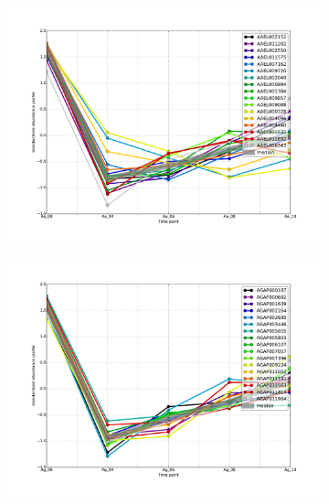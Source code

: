 
\begin{figure}[hp]
% 
\begin{subfigure}[t]{.6\linewidth}
\includegraphics[width=\linewidth]{figures/figs/ecr_and_insects_ptci_20130903/downAt4_gene_profiles_from_cummerbund/Aa_downAt4_cls19_Ag_target_FPKMs_vb_orthos.pdf}
\caption{}
\label{fig:cluster19-Aa}
\end{subfigure}%
%
\begin{subfigure}[t]{.6\linewidth}
\includegraphics[width=\linewidth]{figures/figs/ecr_and_insects_ptci_20130903/downAt4_gene_profiles_from_cummerbund/Ag_downAt4_cls19_Ag_target_FPKMs_vb_orthos.pdf}
\caption{}
\label{fig:cluster19-Ag}
\end{subfigure}
% 
\begin{subfigure}[t]{.7\linewidth}

\end{subfigure}
\end{figure}
